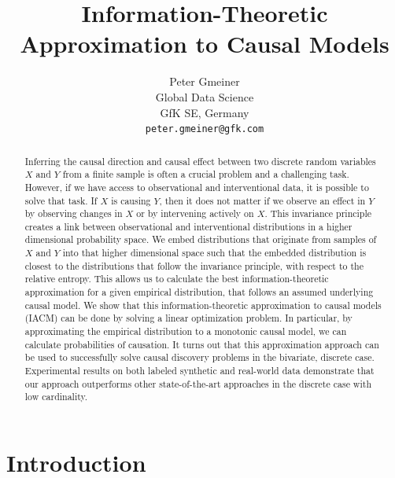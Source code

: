 \documentclass[letterpaper]{article}
\title{Information-Theoretic Approximation to Causal Models}
\author{%
  Peter Gmeiner \\
  Global Data Science\\
  GfK SE, Germany\\
  \texttt{peter.gmeiner@gfk.com} \\
}
\begin{document}
\maketitle

\begin{abstract}
Inferring the causal direction and causal effect between two discrete random variables $X$ and $Y$ from a finite sample is often a crucial problem and a challenging task. However, if we have access to observational and interventional data, it is possible to solve that task. If $X$ is causing $Y$, then it does not matter if we observe an effect in $Y$ by observing changes in $X$ or by intervening actively on $X$. This invariance principle creates a link between observational and interventional distributions in a higher dimensional probability space. We embed distributions that originate from samples of $X$ and $Y$ into that higher dimensional space such that the embedded distribution is closest to the distributions that follow the invariance principle, with respect to the relative entropy. This allows us to calculate the best information-theoretic approximation for a given empirical distribution, that follows an assumed underlying causal model. We show that this information-theoretic approximation to causal models (IACM) can be done by solving a linear optimization problem. In particular, by approximating the empirical distribution to a monotonic causal model, we can calculate probabilities of causation. It turns out that this approximation approach can be used to successfully solve causal discovery problems in the bivariate, discrete case. Experimental results on both labeled synthetic and real-world data demonstrate that our approach outperforms other state-of-the-art approaches in the discrete case with low cardinality.
\end{abstract}

\section{Introduction}
\end{document}
